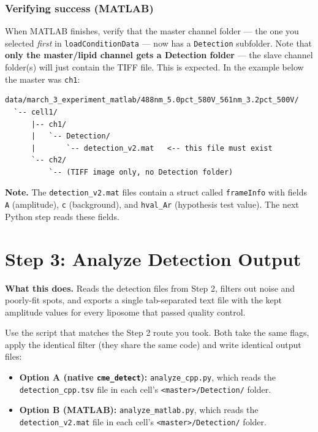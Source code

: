 \documentclass[11pt]{article}
\newcommand{\code}[1]{\texttt{#1}}
\begin{document}
\subsubsection*{Verifying success (MATLAB)}

When MATLAB finishes, verify that the master channel folder --- the
one you selected \emph{first} in \code{loadConditionData} ---
now has a \code{Detection} subfolder. Note that \textbf{only the
master/lipid channel gets a Detection folder} --- the slave channel
folder(s) will just contain the TIFF file. This is expected. In the
example below the master was \code{ch1}:

\begin{lstlisting}
data/march_3_experiment_matlab/488nm_5.0pct_580V_561nm_3.2pct_500V/
  `-- cell1/
      |-- ch1/
      |   `-- Detection/
      |       `-- detection_v2.mat   <-- this file must exist
      `-- ch2/
          `-- (TIFF image only, no Detection folder)
\end{lstlisting}

\begin{notebox}
\textbf{Note.} The \code{detection\_v2.mat} files contain a struct
called \code{frameInfo} with fields \code{A} (amplitude), \code{c}
(background), and \code{hval\_Ar} (hypothesis test value). The next
Python step reads these fields.
\end{notebox}

\section{Step 3: Analyze Detection Output}

\textbf{What this does.} Reads the detection files from Step 2,
filters out noise and poorly-fit spots, and exports a single
tab-separated text file with the kept amplitude values for every
liposome that passed quality control.

Use the script that matches the Step 2 route you took. Both take the
same flags, apply the identical filter (they share the same code) and
write identical output files:

\begin{itemize}[leftmargin=*]
    \item \textbf{Option A (native \code{cme\_detect}):}
    \code{analyze\_cpp.py}, which reads the
    \code{detection\_cpp.tsv} file in each cell's
    \code{<master>/Detection/} folder.
    \item \textbf{Option B (MATLAB):} \code{analyze\_matlab.py}, which
    reads the \code{detection\_v2.mat} file in each cell's
    \code{<master>/Detection/} folder.
\end{itemize}
\end{document}
